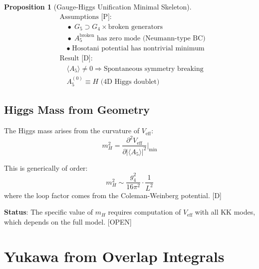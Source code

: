 \documentclass[11pt,a4paper]{article}
\newtheorem{proposition}[theorem]{Proposition}
\begin{document}
\begin{proposition}[Gauge-Higgs Unification Minimal Skeleton]
\label{prop:ghu}
\begin{equation}
\boxed{
\begin{aligned}
&\text{Assumptions [P]:} \\
&\quad \bullet\; G_5 \supset G_4 \times \text{broken generators} \\
&\quad \bullet\; A_5^{\text{broken}} \text{ has zero mode (Neumann-type BC)} \\
&\quad \bullet\; \text{Hosotani potential has nontrivial minimum} \\[0.5em]
&\text{Result [D]:} \\
&\quad \langle A_5 \rangle \neq 0 \Rightarrow \text{Spontaneous symmetry breaking} \\
&\quad A_5^{(0)} \equiv H \text{ (4D Higgs doublet)}
\end{aligned}
}
\end{equation}
\end{proposition}

\subsection{Higgs Mass from Geometry}

The Higgs mass arises from the curvature of $V_{\text{eff}}$:
\begin{equation}
m_H^2 = \frac{\partial^2 V_{\text{eff}}}{\partial |\langle A_5 \rangle|^2}\bigg|_{\text{min}}
\label{eq:higgs-mass}
\end{equation}

This is generically of order:
\begin{equation}
m_H^2 \sim \frac{g_4^2}{16\pi^2} \cdot \frac{1}{L^2}
\label{eq:higgs-mass-estimate}
\end{equation}
where the loop factor comes from the Coleman-Weinberg potential. [D]

\textbf{Status}: The specific value of $m_H$ requires computation of $V_{\text{eff}}$ with
all KK modes, which depends on the full model. [OPEN]

\section{Yukawa from Overlap Integrals}
\label{sec:yukawa}
\end{document}
